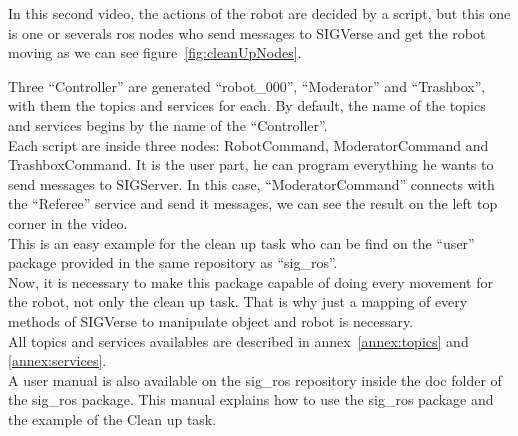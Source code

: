 In this second video, the actions of the robot are decided by a script, but this one is one or severals ros nodes who send messages to SIGVerse and get the robot moving as we can see figure~\ref{fig:cleanUpNodes}.\\

\noindent\begin{minipage}{\linewidth}%
\label{fig:cleanUpNodes}%
\end{minipage}

Three ``Controller'' are generated ``robot\_000'', ``Moderator'' and ``Trashbox'', with them the topics and services for each. By default, the name of the topics and services begins by the name of the ``Controller''.\\
Each script are inside three nodes: RobotCommand, ModeratorCommand and TrashboxCommand. It is the user part, he can program everything he wants to send messages to SIGServer. In this case, ``ModeratorCommand'' connects with the ``Referee'' service and send it messages, we can see the result on the left top corner in the video.\\
This is an easy example for the clean up task who can be find on the ``user'' package provided in the same repository as ``sig\_ros''.\\

Now, it is necessary to make this package capable of doing every movement for the robot, not only the clean up task. That is why just a mapping of every methods of SIGVerse to manipulate object and robot is necessary.\\
All topics and services availables are described in annex~\ref{annex:topics} and \ref{annex:services}.\\
A user manual is also available on the sig\_ros repository inside the doc folder of the sig\_ros package. This manual explains how to use the sig\_ros package and the example of the Clean up task.

